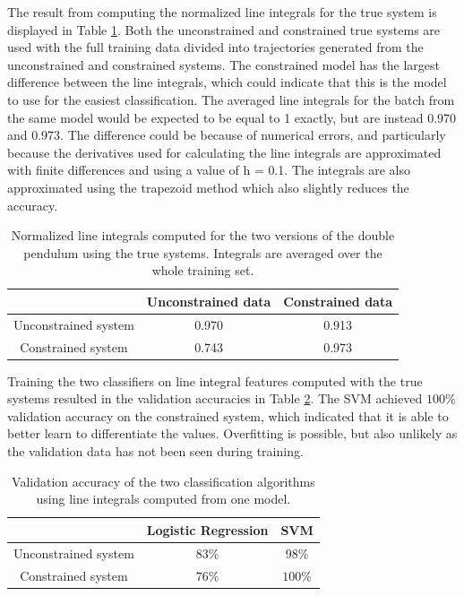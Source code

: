 \documentclass[12pt,a4paper]{book}
\begin{document}
The result from computing the normalized line integrals for the true system is displayed in Table \ref{tab:integrals}. Both the unconstrained and constrained true systems are used with the full training data divided into trajectories generated from the unconstrained and constrained systems. The constrained model has the largest difference between the line integrals, which could indicate that this is the model to use for the easiest classification. The averaged line integrals for the batch from the same model would be expected to be equal to 1 exactly, but are instead 0.970 and 0.973. The difference could be because of numerical errors, and particularly because the derivatives used for calculating the line integrals are approximated with finite differences and using a value of h = 0.1. The integrals are also approximated using the trapezoid method which also slightly reduces the accuracy.

\begin{table}[H]
    \centering
    \caption{Normalized line integrals computed for the two versions of the double pendulum using the true systems. Integrals are averaged over the whole training set.}
    \begin{tabular}{|c | c | c|} 
        \hline
        & Unconstrained data & Constrained data \\
        \hline
        Unconstrained system & 0.970 & 0.913 \\
        \hline
        Constrained system & 0.743 & 0.973 \\
        \hline
    \end{tabular}
    \label{tab:integrals}
\end{table}

Training the two classifiers on line integral features computed with the true systems resulted in the validation accuracies in Table \ref{tab:true_accs}. The SVM achieved $100 \%$ validation accuracy on the constrained system, which indicated that it is able to better learn to differentiate the values. Overfitting is possible, but also unlikely as the validation data has not been seen during training.

\begin{table}[H]
    \centering
    \caption{Validation accuracy of the two classification algorithms using line integrals computed from one model.}
    \begin{tabular}{|c | c | c|} 
        \hline
        & Logistic Regression & SVM \\
        \hline
        Unconstrained system & $83 \%$ & $98 \%$ \\
        \hline
        Constrained system & $76 \%$ & $100 \%$ \\
        \hline
    \end{tabular}
    \label{tab:true_accs}
\end{table}
\end{document}
